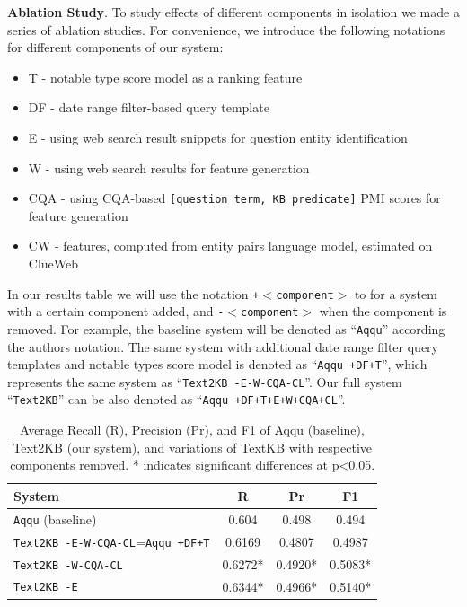 \textbf{Ablation Study}.
To study effects of different components in isolation we made a series of ablation studies.
For convenience, we introduce the following notations for different components of our system:
\begin{itemize}
\setlength\itemsep{-0.5em}
\item T - notable type score model as a ranking feature
\item DF - date range filter-based query template
\item E - using web search result snippets for question entity identification
\item W - using web search results for feature generation
\item CQA - using CQA-based \texttt{[question term, KB predicate]} PMI scores for feature generation
\item CW - features, computed from entity pairs language model, estimated on ClueWeb
\end{itemize}

In our results table we will use the notation \texttt{+$<$component$>$} to for a system with a certain component added, and \texttt{-$<$component$>$} when the component is removed.
For example, the baseline system will be denoted as ``\texttt{Aqqu}'' according the authors notation.
The same system with additional date range filter query templates and notable types score model is denoted as ``\texttt{Aqqu +DF+T}'', which represents the same system as ``\texttt{Text2KB -E-W-CQA-CL}''.
Our full system ``\texttt{Text2KB}'' can be also denoted as ``\texttt{Aqqu +DF+T+E+W+CQA+CL}''.

\begin{table}
\centering
\caption{Average Recall (R), Precision (Pr), and F1 of Aqqu (baseline), Text2KB (our system), and variations of TextKB with respective components removed. * indicates significant differences at p<0.05. }
\label{table:text2kb:ablation:entities_vs_features}
\begin{tabular}{| p{7cm} | c | c | c | }
\hline
System & R & Pr & F1 \\
\hline
\texttt{Aqqu} (baseline) & 0.604 & 0.498 & 0.494\\
\texttt{Text2KB -E-W-CQA-CL}=\texttt{Aqqu +DF+T} & 0.6169 & 0.4807 & 0.4987 \\
\texttt{Text2KB -W-CQA-CL} & 0.6272* & 0.4920* & 0.5083* \\  %
\texttt{Text2KB -E} & 0.6344* & 0.4966* & 0.5140* \\  %
\hline
\end{tabular}
\end{table}

